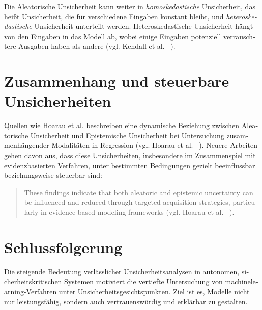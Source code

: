\begin{otherlanguage}{ngerman}
Die \gls{Aleatorische Unsicherheit} kann weiter in \textit{homoskedastische} Unsicherheit, das heißt Unsicherheit, die für verschiedene Eingaben konstant bleibt, und \textit{heteroskedastische} Unsicherheit unterteilt werden. Heteroskedastische Unsicherheit hängt von den Eingaben in das Modell ab, wobei einige Eingaben potenziell verrauschtere Ausgaben haben als andere (vgl. Kendall et al. ~\parencite[S. 2, Z. 1-5]{kendall2017}).

\section{Zusammenhang und steuerbare Unsicherheiten}

Quellen wie Hoarau et al. beschreiben eine dynamische Beziehung zwischen \gls{Aleatorische Unsicherheit} und \gls{Epistemische Unsicherheit} bei Untersuchung zusammenhängender Modalitäten in Regression (vgl. Hoarau et al. ~\parencite[S. 2, Z.10-14]{ArthurHoarau2025}). Neuere Arbeiten gehen davon aus, dass diese Unsicherheiten, insbesondere im Zusammenspiel mit evidenzbasierten Verfahren, unter bestimmten Bedingungen gezielt beeinflussbar beziehungsweise steuerbar sind: 

\begin{quote}
\glqq These findings indicate that both aleatoric and epistemic uncertainty can be influenced and reduced through targeted acquisition strategies, particularly in evidence-based modeling frameworks (vgl. Hoarau et al. ~\parencite[S.2, Z. 43-45]{ArthurHoarau2025}). \grqq{}
\end{quote}

\section{Schlussfolgerung}
Die steigende Bedeutung verlässlicher Unsicherheitsanalysen in autonomen, sicherheitskritischen Systemen motiviert die vertiefte Untersuchung von \gls{machinelearning}-Verfahren unter Unsicherheitsgesichtspunkten. Ziel ist es, Modelle nicht nur leistungsfähig, sondern auch vertrauenswürdig und erklärbar zu gestalten.



\end{otherlanguage}
